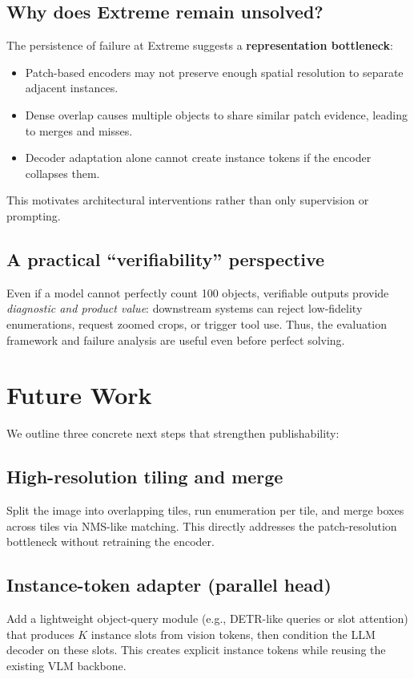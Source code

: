 \documentclass[10pt]{article}
\begin{document}
\subsection{Why does Extreme remain unsolved?}
The persistence of failure at Extreme suggests a \textbf{representation bottleneck}:
\begin{itemize}[leftmargin=1.2em]
  \item Patch-based encoders may not preserve enough spatial resolution to separate adjacent instances.
  \item Dense overlap causes multiple objects to share similar patch evidence, leading to merges and misses.
  \item Decoder adaptation alone cannot create instance tokens if the encoder collapses them.
\end{itemize}
This motivates architectural interventions rather than only supervision or prompting.

\subsection{A practical ``verifiability'' perspective}
Even if a model cannot perfectly count 100 objects, verifiable outputs provide \emph{diagnostic and product value}:
downstream systems can reject low-fidelity enumerations, request zoomed crops, or trigger tool use.
Thus, the evaluation framework and failure analysis are useful even before perfect solving.

\section{Future Work}
We outline three concrete next steps that strengthen publishability:
\subsection{High-resolution tiling and merge}
Split the image into overlapping tiles, run enumeration per tile, and merge boxes across tiles via NMS-like matching.
This directly addresses the patch-resolution bottleneck without retraining the encoder.

\subsection{Instance-token adapter (parallel head)}
Add a lightweight object-query module (e.g., DETR-like queries or slot attention) that produces $K$ instance slots from vision tokens, then condition the LLM decoder on these slots.
This creates explicit instance tokens while reusing the existing VLM backbone.
\end{document}
